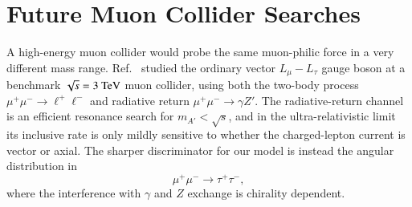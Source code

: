 \documentclass[onecolumn, aps, nofootinbib, prd, preprint, floats, floatfix, amsmath, amssymb, superscriptaddress, preprintnumbers]{revtex4-1}
\begin{document}
\section{Future Muon Collider Searches}
\label{subsec:muon-collider-angular}

A high-energy muon collider would probe the same muon-philic force in a very different mass range. Ref.~\cite{Huang:2021nkl} studied the ordinary vector \(L_\mu-L_\tau\) gauge boson at a benchmark \(\sqrt{s}=3~{\rm TeV}\) muon collider, using both the two-body process \(\mu^+\mu^-\to\ell^+\ell^-\) and radiative return \(\mu^+\mu^-\to\gamma Z'\). The radiative-return channel is an efficient resonance search for \(m_{A'}<\sqrt{s}\), and in the ultra-relativistic limit its inclusive rate is only mildly sensitive to whether the charged-lepton current is vector or axial. The sharper discriminator for our model is instead the angular distribution in
\begin{equation}
\mu^+\mu^-\to\tau^+\tau^- ,
\end{equation}
where the interference with \(\gamma\) and \(Z\) exchange is chirality dependent.
\end{document}
